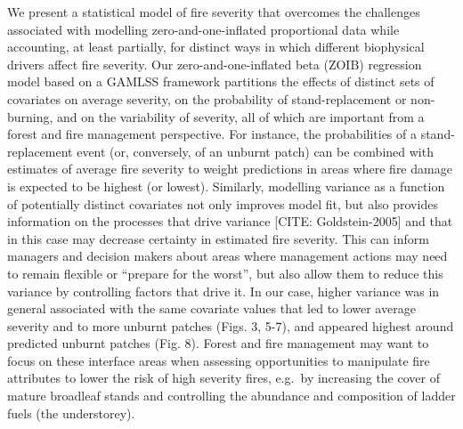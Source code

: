 \documentclass[
  numafflabel,
  authoryear,
  preprint]{elsarticle}
\begin{document}
We present a statistical model of fire severity that overcomes the
challenges associated with modelling zero-and-one-inflated proportional
data while accounting, at least partially, for distinct ways in which
different biophysical drivers affect fire severity. Our
zero-and-one-inflated beta (ZOIB) regression model based on a GAMLSS
framework partitions the effects of distinct sets of covariates on
average severity, on the probability of stand-replacement or
non-burning, and on the variability of severity, all of which are
important from a forest and fire management perspective. For instance,
the probabilities of a stand-replacement event (or, conversely, of an
unburnt patch) can be combined with estimates of average fire severity
to weight predictions in areas where fire damage is expected to be
highest (or lowest). Similarly, modelling variance as a function of
potentially distinct covariates not only improves model fit, but also
provides information on the processes that drive variance {[}CITE:
Goldstein-2005{]} and that in this case may decrease certainty in
estimated fire severity. This can inform managers and decision makers
about areas where management actions may need to remain flexible or
``prepare for the worst'', but also allow them to reduce this variance
by controlling factors that drive it. In our case, higher variance was
in general associated with the same covariate values that led to lower
average severity and to more unburnt patches (Figs. 3, 5-7), and
appeared highest around predicted unburnt patches (Fig. 8). Forest and
fire management may want to focus on these interface areas when
assessing opportunities to manipulate fire attributes to lower the risk
of high severity fires, e.g.~by increasing the cover of mature broadleaf
stands and controlling the abundance and composition of ladder fuels
(the understorey).
\end{document}
